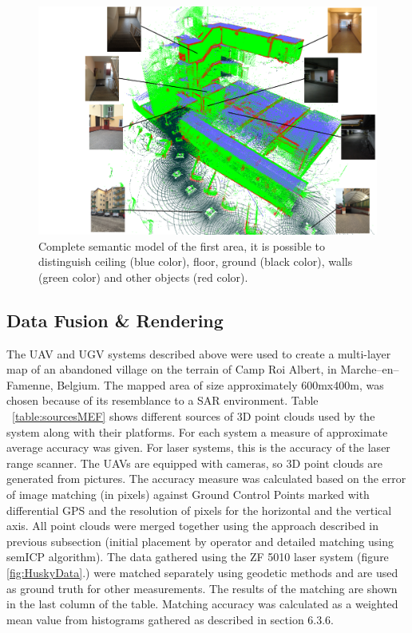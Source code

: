 \documentclass{article}
\begin{document}
\begin{figure}
 \centering
    \includegraphics[width=\textwidth]{ROB-15-0035_fig32.png}
    \caption{Complete semantic model of the first area, it is possible to distinguish ceiling (blue color), floor, ground (black color), walls (green color) and other objects (red color).}
    \label{fig:fullskier}
\end{figure}
\clearpage
\subsection{Data Fusion \& Rendering}
The UAV and UGV systems described above were used to create a multi-layer map of an abandoned village on the terrain of Camp Roi Albert, in Marche--en--Famenne, Belgium. The mapped area of size approximately 600mx400m, was chosen because of its resemblance to a SAR environment. Table ~\ref{table:sourcesMEF} shows different sources of 3D point clouds used by the system along with their platforms. For each system a measure of approximate average accuracy was given.
For laser systems, this is the accuracy of the laser range scanner.
The UAVs are equipped with cameras, so 3D point clouds are generated from pictures.
The accuracy measure was calculated based on the error of image matching (in pixels) against Ground Control Points marked with differential GPS and the resolution of pixels for the horizontal and the vertical axis. All point clouds were merged together using the approach described in previous subsection (initial placement by operator and detailed matching using semICP algorithm).
The data gathered using the ZF 5010 laser system (figure \ref{fig:HuskyData}.) were matched separately using geodetic methods and are used as ground truth for other measurements.
The results of the matching are shown in the last column of the table.
Matching accuracy was calculated as a weighted mean value from histograms gathered as described in section 6.3.6.
\end{document}
